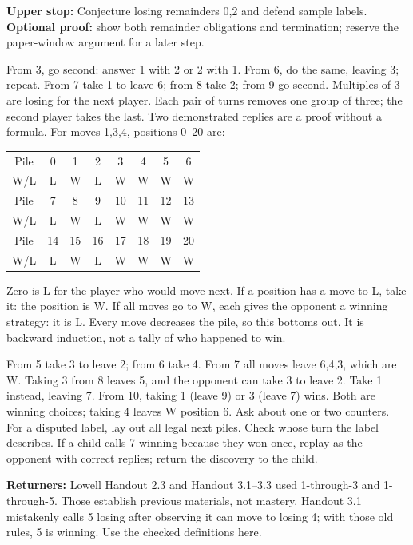 \documentclass[11pt]{article}
\begin{document}
\textbf{Upper stop:} Conjecture losing remainders 0,2 and defend sample labels. \textbf{Optional proof:} show both remainder obligations and termination; reserve the paper-window argument for a later step.

\newpage
{}
From 3, go second: answer 1 with 2 or 2 with 1. From 6, do the same, leaving 3; repeat. From 7 take 1 to leave 6; from 8 take 2; from 9 go second. Multiples of 3 are losing for the next player. Each pair of turns removes one group of three; the second player takes the last. Two demonstrated replies are a proof without a formula.
For moves 1,3,4, positions 0--20 are:
\begin{center}\renewcommand{\arraystretch}{1.4}\begin{tabular}{c|ccccccc}Pile&0&1&2&3&4&5&6\\W/L&L&W&L&W&W&W&W\\\hline Pile&7&8&9&10&11&12&13\\W/L&L&W&L&W&W&W&W\\\hline Pile&14&15&16&17&18&19&20\\W/L&L&W&L&W&W&W&W\end{tabular}\end{center}
Zero is L for the player who would move next. If a position has a move to L, take it: the position is W. If all moves go to W, each gives the opponent a winning strategy: it is L. Every move decreases the pile, so this bottoms out. It is backward induction, not a tally of who happened to win.

From 5 take 3 to leave 2; from 6 take 4. From 7 all moves leave 6,4,3, which are W. Taking 3 from 8 leaves 5, and the opponent can take 3 to leave 2. Take 1 instead, leaving 7. From 10, taking 1 (leave 9) or 3 (leave 7) wins. Both are winning choices; taking 4 leaves W position 6.
Ask about one or two counters. For a disputed label, lay out all legal next piles. Check whose turn the label describes. If a child calls 7 winning because they won once, replay as the opponent with correct replies; return the discovery to the child.

\textbf{Returners:} Lowell Handout 2.3 and Handout 3.1--3.3 used 1-through-3 and 1-through-5. Those establish previous materials, not mastery. Handout 3.1 mistakenly calls 5 losing after observing it can move to losing 4; with those old rules, 5 is winning. Use the checked definitions here.
\end{document}
